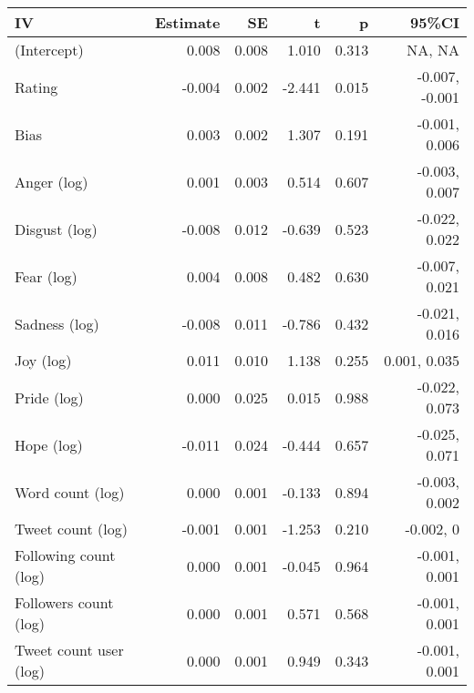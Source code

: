 
\begin{tabular}{lrrrrr}
\toprule
IV & Estimate & SE & t & p & 95\%CI\\
\midrule
(Intercept) & 0.008 & 0.008 & 1.010 & 0.313 & NA, NA\\
Rating & -0.004 & 0.002 & -2.441 & 0.015 & -0.007, -0.001\\
Bias & 0.003 & 0.002 & 1.307 & 0.191 & -0.001, 0.006\\
Anger (log) & 0.001 & 0.003 & 0.514 & 0.607 & -0.003, 0.007\\
Disgust (log) & -0.008 & 0.012 & -0.639 & 0.523 & -0.022, 0.022\\
Fear (log) & 0.004 & 0.008 & 0.482 & 0.630 & -0.007, 0.021\\
Sadness (log) & -0.008 & 0.011 & -0.786 & 0.432 & -0.021, 0.016\\
Joy (log) & 0.011 & 0.010 & 1.138 & 0.255 & 0.001, 0.035\\
Pride (log) & 0.000 & 0.025 & 0.015 & 0.988 & -0.022, 0.073\\
Hope (log) & -0.011 & 0.024 & -0.444 & 0.657 & -0.025, 0.071\\
Word count (log) & 0.000 & 0.001 & -0.133 & 0.894 & -0.003, 0.002\\
Tweet count (log) & -0.001 & 0.001 & -1.253 & 0.210 & -0.002, 0\\
Following count (log) & 0.000 & 0.001 & -0.045 & 0.964 & -0.001, 0.001\\
Followers count (log) & 0.000 & 0.001 & 0.571 & 0.568 & -0.001, 0.001\\
Tweet count user (log) & 0.000 & 0.001 & 0.949 & 0.343 & -0.001, 0.001\\
\bottomrule
\end{tabular}
